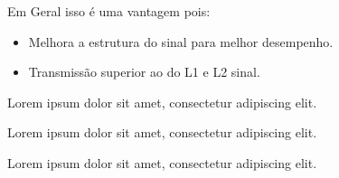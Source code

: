 Em Geral isso é uma vantagem pois:
\begin{itemize}
    \item Melhora a estrutura do sinal para melhor desempenho.
    \item Transmissão superior ao do L1 e L2 sinal.
\end{itemize}

\begin{center}
    Lorem ipsum dolor sit amet, consectetur adipiscing elit.
\end{center}

\begin{flushleft}
    Lorem ipsum dolor sit amet, consectetur adipiscing elit.
\end{flushleft}

\begin{flushright}
    Lorem ipsum dolor sit amet, consectetur adipiscing elit.
\end{flushright}